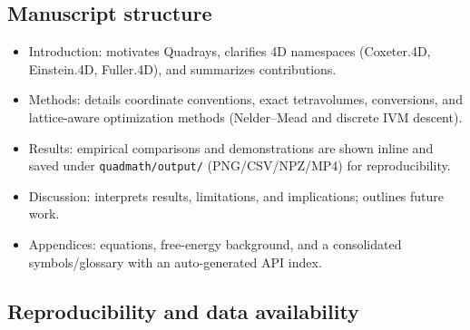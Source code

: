 \documentclass[
]{article}
\providecommand{\tightlist}{%
  \setlength{\itemsep}{0pt}\setlength{\parskip}{0pt}}
\begin{document}
\hypertarget{manuscript-structure}{%
\subsection{Manuscript structure}\label{manuscript-structure}}

\begin{itemize}
\tightlist
\item
  Introduction: motivates Quadrays, clarifies 4D namespaces (Coxeter.4D,
  Einstein.4D, Fuller.4D), and summarizes contributions.
\item
  Methods: details coordinate conventions, exact tetravolumes,
  conversions, and lattice-aware optimization methods (Nelder--Mead and
  discrete IVM descent).
\item
  Results: empirical comparisons and demonstrations are shown inline and
  saved under \texttt{quadmath/output/} (PNG/CSV/NPZ/MP4) for
  reproducibility.
\item
  Discussion: interprets results, limitations, and implications;
  outlines future work.
\item
  Appendices: equations, free-energy background, and a consolidated
  symbols/glossary with an auto-generated API index.
\end{itemize}

\hypertarget{reproducibility-and-data-availability}{%
\subsection{Reproducibility and data
availability}\label{reproducibility-and-data-availability}}
\end{document}
